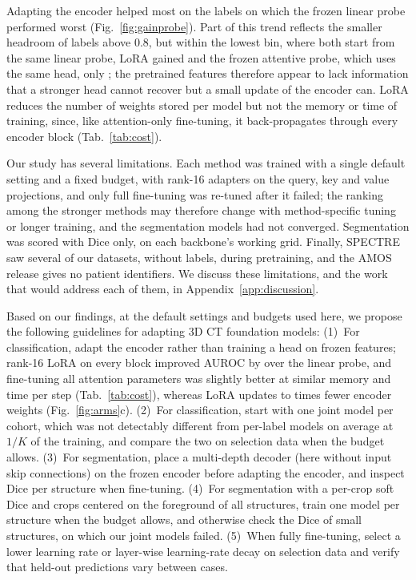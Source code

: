 Adapting the encoder helped most on the labels on which the frozen linear probe performed worst (Fig.~\ref{fig:gainprobe}). Part of this trend reflects the smaller headroom of labels above 0.8, but within the lowest bin, where both start from the same linear probe, LoRA gained \magn{\numGainbinLowMeandiff} and the frozen attentive probe, which uses the same head, only \magn{\numGainbinattnLowMeandiff}; the pretrained features therefore appear to lack information that a stronger head cannot recover but a small update of the encoder can. LoRA reduces the number of weights stored per model but not the memory or time of training, since, like attention-only fine-tuning, it back-propagates through every encoder block (Tab.~\ref{tab:cost}).

Our study has several limitations. Each method was trained with a single default setting and a fixed budget, with rank-16 adapters on the query, key and value projections, and only full fine-tuning was re-tuned after it failed; the ranking among the stronger methods may therefore change with method-specific tuning or longer training, and the segmentation models had not converged. Segmentation was scored with Dice only, on each backbone's working grid. Finally, SPECTRE saw several of our datasets, without labels, during pretraining, and the AMOS release gives no patient identifiers. We discuss these limitations, and the work that would address each of them, in Appendix~\ref{app:discussion}.

Based on our findings, at the default settings and budgets used here, we propose the following guidelines for adapting 3D CT foundation models: (1)~For classification, adapt the encoder rather than training a head on frozen features; rank-16 LoRA on every block improved AUROC by \magn{\numCiClsloralinAllMeandiff} over the linear probe, and fine-tuning all attention parameters was slightly better at similar memory and time per step (Tab.~\ref{tab:cost}), whereas LoRA updates \numParamsratioPillarZAttnftLora{} to \numParamsratioSpectreAttnftLora{} times fewer encoder weights (Fig.~\ref{fig:arms}c). (2)~For classification, start with one joint model per cohort, which was not detectably different from per-label models on average at $1/K$ of the training, and compare the two on selection data when the budget allows. (3)~For segmentation, place a multi-depth decoder (here without input skip connections) on the frozen encoder before adapting the encoder, and inspect Dice per structure when fine-tuning. (4)~For segmentation with a per-crop soft Dice and crops centered on the foreground of all structures, train one model per structure when the budget allows, and otherwise check the Dice of small structures, on which our joint models failed. (5)~When fully fine-tuning, select a lower learning rate or layer-wise learning-rate decay on selection data and verify that held-out predictions vary between cases.
